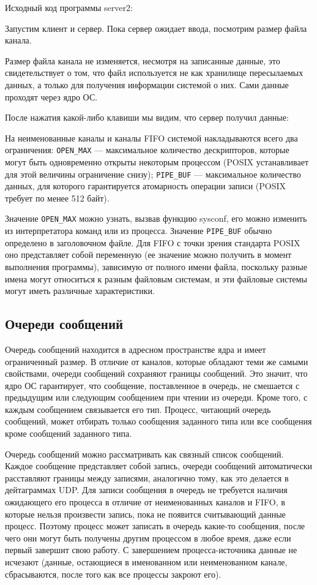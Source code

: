 \documentclass[a4paper]{article}
\begin{document}
	Исходный код программы server2:
	

	Запустим клиент и сервер. Пока сервер ожидает ввода, посмотрим размер файла канала.
	
 	
 	Размер файла канала не изменяется, несмотря на записанные данные, это свидетельствует о том, что файл используется не как хранилище пересылаемых данных, а только для получения информации системой о них. Сами данные проходят через ядро ОС.
 	
 	После нажатия какой-либо клавиши мы видим, что сервер получил данные:
	

	На неименованные каналы и каналы FIFO системой накладываются всего два ограничения: \texttt{OPEN\_MAX} --- максимальное количество дескрипторов, которые могут быть одновременно открыты некоторым процессом (POSIX устанавливает для этой величины ограничение снизу); \texttt{PIPE\_BUF} --- максимальное количество данных, для которого гарантируется атомарность операции записи (POSIX требует по менее 512 байт).
	
	Значение \texttt{OPEN\_MAX} можно узнать, вызвав функцию sysconf, его можно изменить из интерпретатора команд или из процесса. Значение \texttt{PIPE\_BUF} обычно определено в заголовочном файле. Для FIFO с точки зрения стандарта POSIX оно представляет собой переменную (ее значение можно получить в момент выполнения программы), зависимую от полного имени файла, поскольку разные имена могут относиться к разным файловым системам, и эти файловые системы могут иметь различные характеристики.

\subsection{Очереди сообщений}
	Очередь сообщений находится в адресном пространстве ядра и имеет ограниченный размер. В отличие от каналов, которые обладают теми же самыми свойствами, очереди сообщений сохраняют границы сообщений. Это значит, что ядро ОС гарантирует, что сообщение, поставленное в очередь, не смешается с предыдущим или следующим сообщением при чтении из очереди. Кроме того, с каждым сообщением связывается его тип. Процесс, читающий очередь сообщений, может отбирать только сообщения заданного типа или все сообщения кроме сообщений заданного типа.
	
	Очередь сообщений можно рассматривать как связный список сообщений. Каждое сообщение представляет собой запись, очереди сообщений автоматически расставляют границы между записями, аналогично тому, как это делается в дейтаграммах UDP. Для записи сообщения в очередь не требуется наличия ожидающего его процесса в отличие от неименованных каналов и FIFO, в которые нельзя произвести запись, пока не появится считывающий данные процесс. Поэтому процесс может записать в очередь какие-то сообщения, после чего они могут быть получены другим процессом в любое время, даже если первый завершит свою работу. С завершением процесса-источника данные не исчезают (данные, остающиеся в именованном или неименованном канале, сбрасываются, после того как все процессы закроют его).
	
\end{document}
